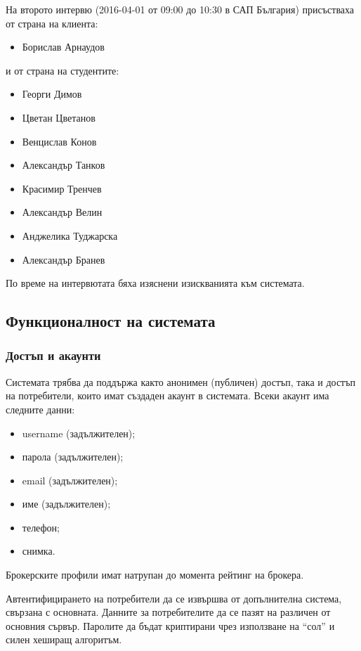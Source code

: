 \documentclass[a4paper]{article}
\begin{document}
На второто интервю (2016-04-01 от 09:00 до 10:30 в САП България) присъстваха от страна на клиента:
\begin{itemize}
\item Борислав Арнаудов
\end{itemize}
и от страна на студентите:
\begin{itemize}
\item Георги Димов
\item Цветан Цветанов
\item Венцислав Конов
\item Александър Танков
\item Красимир Тренчев
\item Александър Велин
\item Анджелика Туджарска
\item Александър Бранев
\end{itemize}

По време на интервютата бяха изяснени изискванията към системата.

\subsection{Функционалност на системата}

\subsubsection{Достъп и акаунти}

Системата трябва да поддържа както анонимен (публичен) достъп, така и достъп на потребители, които имат създаден акаунт в системата. Всеки акаунт има следните данни:
	\begin{itemize}
	\item username (задължителен);
	\item парола (задължителен);
	\item email (задължителен);
	\item име (задължителен);
	\item телефон;
	\item снимка.
	\end{itemize}

Брокерските профили имат натрупан до момента рейтинг на брокера.
				
Автентифицирането на потребители да се извършва от допълнителна система, свързана с основната. Данните за потребителите да се пазят на различен от основния сървър. Паролите да бъдат криптирани чрез използване на ``сол'' и силен хеширащ алгоритъм. 
\end{document}
